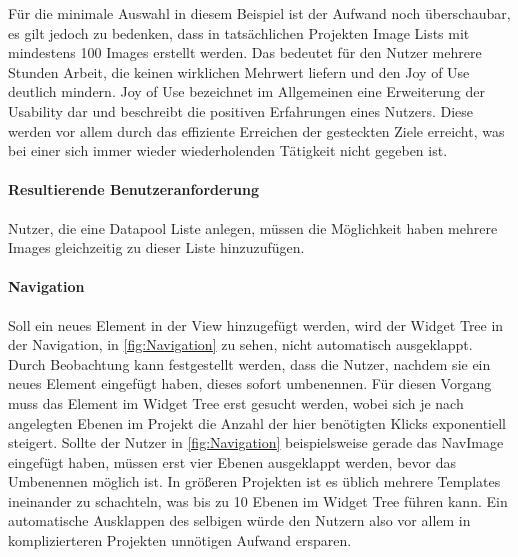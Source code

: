 Für die minimale Auswahl in diesem Beispiel ist der Aufwand noch überschaubar, es gilt jedoch zu bedenken, dass in tatsächlichen Projekten Image Lists mit mindestens 100 Images erstellt werden.
Das bedeutet für den Nutzer mehrere Stunden Arbeit, die keinen wirklichen Mehrwert liefern und den Joy of Use deutlich mindern.
Joy of Use bezeichnet im Allgemeinen eine Erweiterung der Usability dar und beschreibt die positiven Erfahrungen eines Nutzers.
Diese werden vor allem durch das effiziente Erreichen der gesteckten Ziele erreicht, was bei einer sich immer wieder wiederholenden Tätigkeit nicht gegeben ist.



\paragraph{Resultierende Benutzeranforderung}
Nutzer, die eine Datapool Liste anlegen, müssen die Möglichkeit haben mehrere Images gleichzeitig zu dieser Liste hinzuzufügen.

\paragraph{Navigation}
Soll ein neues Element in der View hinzugefügt werden, wird der Widget Tree in der Navigation, in \cref{fig:Navigation} zu sehen, nicht automatisch ausgeklappt.
Durch Beobachtung kann festgestellt werden, dass die Nutzer, nachdem sie ein neues Element eingefügt haben, dieses sofort umbenennen. 
Für diesen Vorgang muss das Element im Widget Tree erst gesucht werden, wobei sich je nach angelegten Ebenen im Projekt die Anzahl der hier benötigten Klicks exponentiell steigert.
Sollte der Nutzer in \cref{fig:Navigation} beispielsweise gerade das NavImage eingefügt haben, müssen erst vier Ebenen ausgeklappt werden, bevor das Umbenennen möglich ist.
In größeren Projekten ist es üblich mehrere Templates ineinander zu schachteln, was bis zu 10 Ebenen im Widget Tree führen kann.
Ein automatische Ausklappen des selbigen würde den Nutzern also vor allem in komplizierteren Projekten unnötigen Aufwand ersparen.

